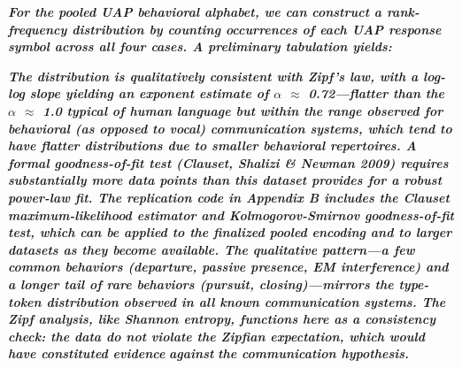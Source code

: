 \documentclass[11pt,letterpaper]{article}
\begin{document}
\textbf{\textit{For the pooled UAP behavioral alphabet, we can construct a rank-frequency distribution by counting occurrences of each UAP response symbol across all four cases. A preliminary tabulation yields:}}


\begin{table}[H]
\centering
\small
{}
\caption*{\small\textit{Table 14. Preliminary rank-frequency distribution of pooled UAP behavioral symbols.}}
\end{table}


\textbf{\textit{The distribution is qualitatively consistent with Zipf's law, with a log-log slope yielding an exponent estimate of $\alpha$ $\approx$ 0.72---flatter than the $\alpha$ $\approx$ 1.0 typical of human language but within the range observed for behavioral (as opposed to vocal) communication systems, which tend to have flatter distributions due to smaller behavioral repertoires. A formal goodness-of-fit test (Clauset, Shalizi \& Newman 2009) requires substantially more data points than this dataset provides for a robust power-law fit. The replication code in Appendix B includes the Clauset maximum-likelihood estimator and Kolmogorov-Smirnov goodness-of-fit test, which can be applied to the finalized pooled encoding and to larger datasets as they become available. The qualitative pattern---a few common behaviors (departure, passive presence, EM interference) and a longer tail of rare behaviors (pursuit, closing)---mirrors the type-token distribution observed in all known communication systems. The Zipf analysis, like Shannon entropy, functions here as a consistency check: the data do not violate the Zipfian expectation, which would have constituted evidence }}\textbf{\textit{against}}\textbf{\textit{ the communication hypothesis.}}
\end{document}
